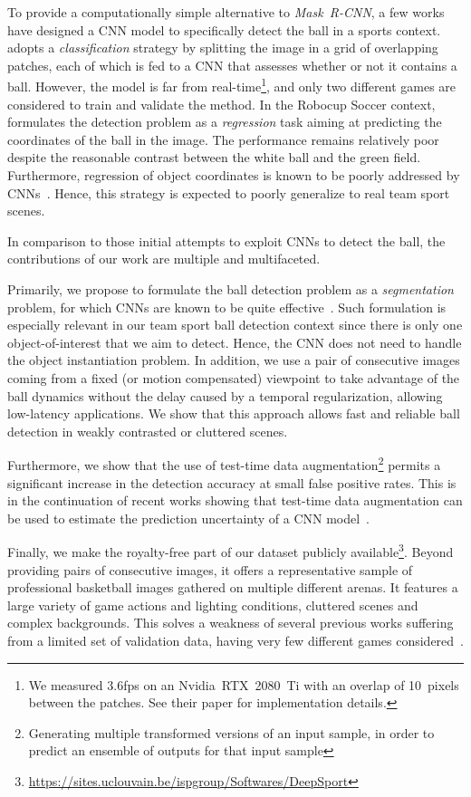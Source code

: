 \documentclass[sigconf, screen]{acmart}
\begin{document}
To provide a computationally simple alternative to \emph{Mask~R-CNN}, a few works have designed a CNN model to specifically detect the ball in a sports context.
\cite{Reno2018a} adopts a \emph{classification} strategy by splitting the image in a grid of overlapping patches, each of which is fed to a CNN that assesses whether or not it contains a ball. However, the model is far from real-time\footnote{We measured $3.6$fps on an Nvidia~RTX~2080~Ti with an overlap of 10~pixels between the patches. See their paper for implementation details.}, and only two different games are considered to train and validate the method.
In the Robocup Soccer context, \cite{Speck2017a} formulates the detection problem as a \emph{regression} task aiming at predicting the coordinates of the ball in the image. The performance remains relatively poor despite the reasonable contrast
between the white ball and the green field. Furthermore, regression of object coordinates is known to be poorly addressed by CNNs~\cite{Liu2018}. Hence, this strategy is expected to poorly generalize to real team sport scenes.

In comparison to those initial attempts to exploit CNNs to detect the ball, the contributions of our work are multiple and multifaceted.

Primarily, we propose to formulate the ball detection problem as a \emph{segmentation} problem, for which CNNs are known to be quite effective~\cite{Chen2017a}. Such formulation is especially relevant in our team sport ball detection context since there is only one object-of-interest that we aim to detect. Hence, the CNN does not need to handle the object instantiation problem.
In addition, we use a pair of consecutive images coming from a fixed (or motion compensated) viewpoint to take advantage of the ball dynamics without the delay caused by a temporal regularization, allowing low-latency applications.
We show that this approach allows fast and reliable ball detection in weakly contrasted or cluttered scenes.

Furthermore, we show that the use of test-time data augmentation\footnote{Generating multiple transformed versions of an input sample, in order to predict an ensemble of outputs for that input sample} permits a significant increase in the detection accuracy at small false positive rates. This is in the continuation of recent works showing that test-time data augmentation can be used to estimate the prediction uncertainty of a CNN model~\cite{Ayhan2018, Wang2019}.

Finally, we make the royalty-free part of our dataset publicly available\footnote{\url{https://sites.uclouvain.be/ispgroup/Softwares/DeepSport}}.
Beyond providing pairs of consecutive images, it offers a representative sample of professional basketball images gathered on multiple different arenas. It features a large variety of game actions and lighting conditions, cluttered scenes and complex backgrounds. This solves a weakness of several previous works suffering from a limited set of validation data, having very few different games considered~\cite{Parisot2019b, Reno2018a, Speck2017a}.
\end{document}
